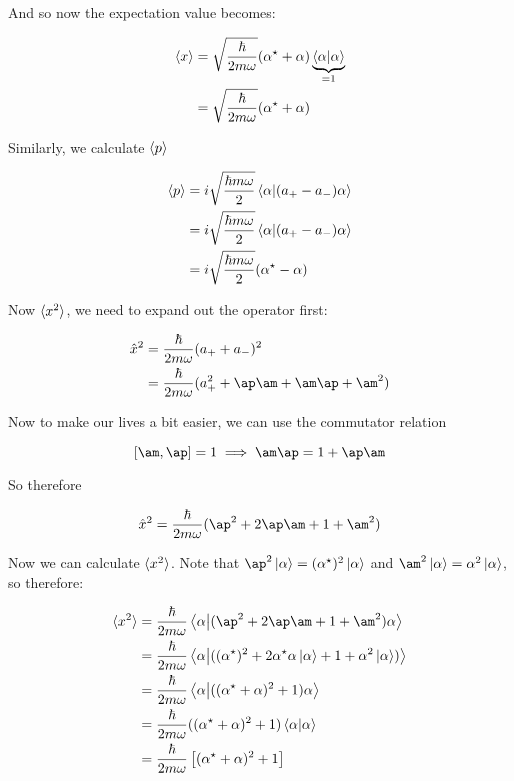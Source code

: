 \documentclass[10pt]{article}
\begin{document}
\begin{enumerate}[(a)]
\begin{solution}
            And so now the expectation value becomes:

            \begin{align*}
                \langle x \rangle &= \sqrt{\frac{\hbar}{2m \omega}}(\alpha^\star + \alpha) \underbrace{\braket{\alpha}{\alpha}}_{= 1}\\
                &= \sqrt{\frac{\hbar}{2m \omega}}(\alpha^\star + \alpha) 
            \end{align*}

            Similarly, we calculate $\langle p \rangle$

            \begin{align*}
                \langle p \rangle &= i\sqrt{\frac{\hbar m \omega}{2}}\braket{\alpha}{ (a_+ - a_-)\alpha}\\
                &= i\sqrt{\frac{\hbar m \omega}{2}}\braket{\alpha}{(a_+ - a_-)\alpha}\\
                &= i\sqrt{\frac{\hbar m \omega}{2}}(\alpha^\star - \alpha)
            \end{align*}

            Now $\langle x^2 \rangle$, we need to expand out the operator first:

            \begin{align*}
                \hat x^2 &= \frac{\hbar}{2m \omega} (a_+ + a_-)^2\\
                &= \frac{\hbar}{2m\omega}(a_+^2 + \ap \am + \am \ap + \am^2)
            \end{align*}

            Now to make our lives a bit easier, we can use the commutator relation

            \[ [\am, \ap] = 1 \implies \am \ap = 1 + \ap \am\]

            So therefore

            \[ \hat x^2 = \frac{\hbar}{2m \omega} (\ap^2 + 2\ap \am +1 + \am^2)\]

            Now we can calculate $\langle x^2 \rangle$. Note that $\ap^2 \ket \alpha = (\alpha^\star)^2 \ket \alpha$ and $\am^2 \ket \alpha = \alpha^2 \ket \alpha$, so therefore: 

            \begin{align*}
                \mean{x^2} &= \frac{\hbar}{2m\omega}\braket{\alpha}{(\ap^2 + 2\ap \am + 1 + \am^2)\alpha}\\
                &= \frac{\hbar}{2m\omega}\braket{\alpha}{((\alpha^\star)^2 + 2 \alpha^\star \alpha \ket \alpha + 1 + \alpha^2 \ket \alpha)}\\
                &= \frac{\hbar}{2m\omega}\braket{\alpha}{((\alpha^\star + \alpha)^2 +1 )\alpha}\\
                &= \frac{\hbar}{2m\omega}((\alpha^\star + \alpha)^2 + 1) \braket{\alpha}{\alpha}\\
                &= \frac{\hbar}{2m\omega}\left[(\alpha^\star + \alpha)^2 + 1\right]
            \end{align*}



\end{solution}
\end{enumerate}
\end{document}
